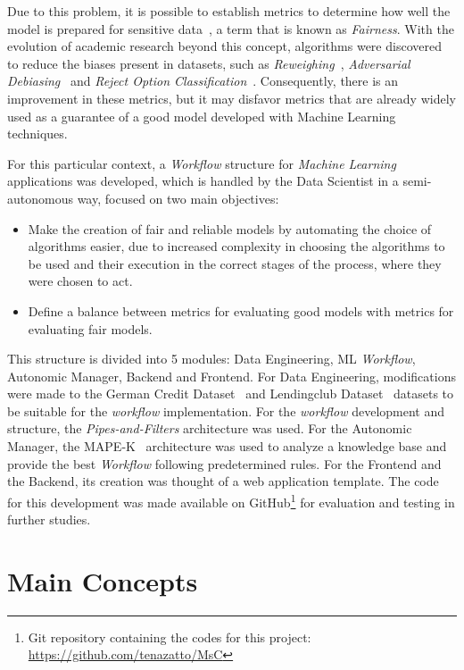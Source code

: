 \documentclass[runningheads]{llncs}
\begin{document}
Due to this problem, it is possible to establish metrics to determine how well the model is prepared for sensitive data~\citep{Begley_2021}, a term that is known as \textit{Fairness}. With the evolution of academic research beyond this concept, algorithms were discovered to reduce the biases present in datasets, such as \textit{Reweighing}~\citep{Kamiran_2011}, \textit{Adversarial Debiasing}~\citep{Zhang_2018} and \textit {Reject Option Classification}~\citep{Kamiran_2012}. Consequently, there is an improvement in these metrics, but it may disfavor metrics that are already widely used as a guarantee of a good model developed with Machine Learning techniques.

For this particular context, a \textit{Workflow} structure for \textit{Machine Learning} applications was developed, which is handled by the Data Scientist in a semi-autonomous way, focused on two main objectives:

\begin{itemize}
\item Make the creation of fair and reliable models by automating the choice of algorithms easier, due to increased complexity in choosing the algorithms to be used and their execution in the correct stages of the process, where they were chosen to act.
\item Define a balance between metrics for evaluating good models with metrics for evaluating fair models.
\end{itemize}

This structure is divided into 5 modules: Data Engineering, ML \textit{Workflow}, Autonomic Manager, Backend and Frontend. For Data Engineering, modifications were made to the German Credit Dataset~\citep{ucigerman_2021} and Lendingclub Dataset~\citep{lendingclub_2022} datasets to be suitable for the \textit{workflow} implementation. For the \textit{workflow} development and structure, the \textit{Pipes-and-Filters} architecture was used. For the Autonomic Manager, the MAPE-K~\citep{IBM_2005} architecture was used to analyze a knowledge base and provide the best \textit{Workflow} following predetermined rules. For the Frontend and the Backend, its creation was thought of a web application template. The code for this development was made available on GitHub\footnote{Git repository containing the codes for this project: \url{https://github.com/tenazatto/MsC}} for evaluation and testing in further studies.

\section{Main Concepts}
\end{document}
